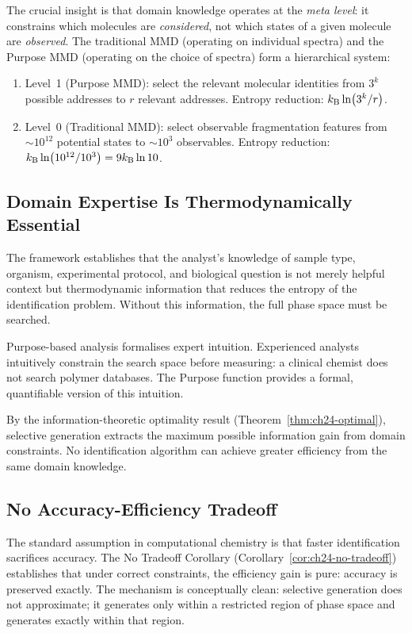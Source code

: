 The crucial insight is that domain knowledge operates at the \emph{meta level}:
it constrains which molecules are \emph{considered}, not which states of a
given molecule are \emph{observed}.  The traditional MMD (operating on
individual spectra) and the Purpose MMD (operating on the choice of spectra)
form a hierarchical system:
\begin{enumerate}
  \item Level~1 (Purpose MMD): select the relevant molecular identities from
    $3^k$ possible addresses to $r$ relevant addresses.  Entropy reduction:
    $k_{\mathrm{B}} \ln(3^k/r)$.
  \item Level~0 (Traditional MMD): select observable fragmentation features
    from $\sim 10^{12}$ potential states to $\sim 10^3$ observables.
    Entropy reduction: $k_{\mathrm{B}} \ln(10^{12}/10^3) = 9k_{\mathrm{B}} \ln 10$.
\end{enumerate}

\subsection{Domain Expertise Is Thermodynamically Essential}
\label{sec:ch24-expertise}

The framework establishes that the analyst's knowledge of sample type,
organism, experimental protocol, and biological question is not merely helpful
context but thermodynamic information that reduces the entropy of the
identification problem.  Without this information, the full phase space must
be searched.

Purpose-based analysis formalises expert intuition.  Experienced analysts
intuitively constrain the search space before measuring: a clinical chemist
does not search polymer databases.  The Purpose function provides a formal,
quantifiable version of this intuition.

By the information-theoretic optimality result (Theorem~\ref{thm:ch24-optimal}),
selective generation extracts the maximum possible information gain from domain
constraints.  No identification algorithm can achieve greater efficiency from
the same domain knowledge.

\subsection{No Accuracy-Efficiency Tradeoff}
\label{sec:ch24-no-tradeoff}

The standard assumption in computational chemistry is that faster identification
sacrifices accuracy.  The No Tradeoff Corollary (Corollary~\ref{cor:ch24-no-tradeoff})
establishes that under correct constraints, the efficiency gain is pure: accuracy
is preserved exactly.  The mechanism is conceptually clean: selective generation
does not approximate; it generates only within a restricted region of phase
space and generates exactly within that region.

